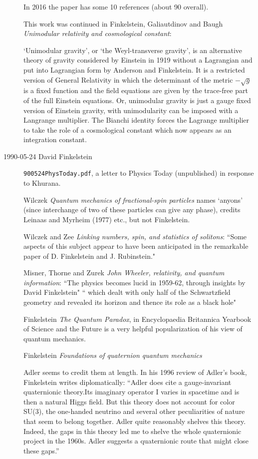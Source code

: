 \begin{description}
In 2016 the paper has some 10 references (about 90 overall).

This work was continued in
Finkelstein, Galiautdinov and Baugh
{\em Unimodular relativity and cosmological constant}:

`Unimodular gravity', or `the Weyl-transverse gravity', is an alternative
theory of gravity considered by Einstein in 1919 without a Lagrangian and
put into Lagrangian form by Anderson and Finkelstein. It is
a restricted version of General Relativity in which the determinant of
the metric $-\sqrt{g}$ is a fixed function and the field equations are
given by the trace-free part of the full Einstein equations. Or,
unimodular gravity is just a gauge  fixed version of Einstein gravity,
with unimodularity can be imposed with a Langrange multiplier.  The
Bianchi identity forces the Lagrange multiplier to take the role of a
cosmological constant which now appears as an integration constant.


\item[1990-05-24 David Finkelstein] \texttt{900524PhysToday.pdf}, a
letter to Physics Today (unpublished) in response to Khurana.

Wilczek {\em Quantum mechanics of fractional-spin
particles} names `anyons' (since interchange of two of these particles
can give any phase), credits  Leinaas and Myrheim (1977) etc., but not
Finkelstein.

Wilczek and Zee
{\em Linking numbers, spin, and statistics of solitons}:
``Some aspects of this subject appear to have been anticipated in the
remarkable paper of D. Finkelstein and J. Rubinstein."

Misner, Thorne and Zurek
{\em {John Wheeler}, relativity, and quantum information}:
``The physics becomes lucid in 1959-62, through insights by David
Finkelstein"
`` which dealt with only half of the Schwartzfield geometry and revealed
its horizon and thence its role as a black hole"

Finkelstein {\em The Quantum Paradox},
in {Encyclopaedia Britannica} {Yearbook of Science and the Future}
is a very helpful popularization of his view of quantum mechanics.

Finkelstein \etal{}
{\em Foundations of quaternion quantum mechanics}

Adler seems to credit them at length. In his 1996 review of
Adler's book, Finkelstein writes diplomatically: ``Adler
does cite a gauge-invariant quaternionic theory.Its imaginary operator
I varies in spacetime and is then a natural Higgs field. But this
theory does not account for color SU(3), the one-handed neutrino and
several other peculiarities of nature that seem to belong together.
Adler quite reasonably shelves this theory. Indeed, the gaps in this
theory led me to shelve the whole quaternionic project in the 1960s.
Adler suggests a quaternionic route that might close these gaps.''


\end{description}
